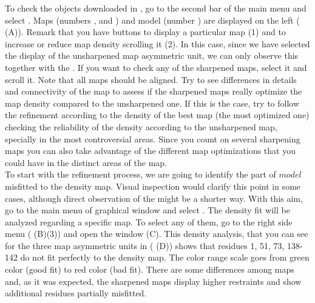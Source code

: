   To check the objects downloaded in \coot, go to the second bar of the main menu and select . Maps (numbers ,  and ) and model  (number ) are displayed on the left ( (A)). Remark that you have buttons to display a particular map (1) and to increase or reduce map density scrolling it (2). In this case, since we have selected the display of the unsharpened map asymmetric unit, we can only observe this  together with the . If you want to check any of the sharpened maps, select it and scroll it. Note that all maps should be aligned. Try to see differences in details and connectivity of the map to assess if the sharpened maps really optimize the map density compared to the unsharpened one. If this is the case, try to follow the refinement according to the density of the best map (the most optimized one) checking the reliability of the density according to the unsharpened map, specially in the most controversial areas. Since you count on several sharpening maps you can also take advantage of the different map optimizations that you could have in the distinct areas of the map.\\  
  
  To start with the refinement process, we are going to identify the part of $model$ misfitted to the density map. Visual inspection would clarify this point in some cases, although direct observation of the  might be a shorter way. With this aim, go to the main menu of \coot graphical window and select . The density fit will be analyzed regarding a specific map. To select any of them, go to the \coot right side menu ( (B)(3)) and open the  window (C). This density analysis, that you can see for the three map asymmetric units in ( (D)) shows that residues 1, 51, 73, 138-142 do not fit perfectly to the density map. The color range scale goes from green color (good fit) to red color (bad fit). There are some differences among maps and, as it was expected, the sharpened maps display higher restraints and show additional residues partially misfitted.
 
